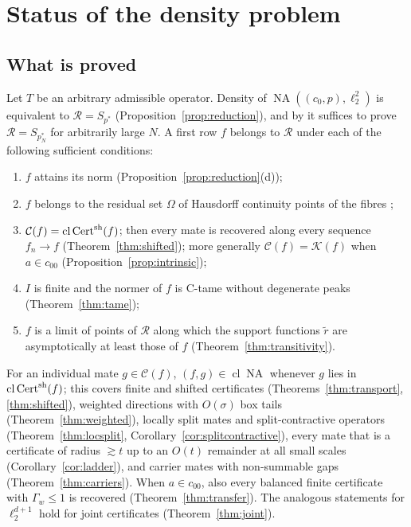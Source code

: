 \documentclass[10pt]{amsart}
\theoremstyle{definition}
\theoremstyle{remark}
\newcommand{\NA}{\operatorname{NA}}
\newcommand{\Cset}{\mathcal C}
\newcommand{\Cert}{\operatorname{Cert}}
\newcommand{\cl}{\operatorname{cl}}
\newcommand{\Rec}{\mathcal R}
\begin{document}
\section{Status of the density problem}\label{sec:status}

\subsection{What is proved}
Let $T$ be an arbitrary admissible operator.  Density of
$\NA((c_0,p),\ell_2^2)$ is equivalent to $\Rec=S_{p^*}$
(Proposition~\ref{prop:reduction}), and by \cite[Remark martin-tail]{PrB} it
suffices to prove $\Rec=S_{p_N^*}$ for arbitrarily large $N$.  A first row
$f$ belongs to $\Rec$ under each of the following sufficient conditions:
\begin{enumerate}
\item[(S1)] $f$ attains its norm (Proposition~\ref{prop:reduction}(d));
\item[(S2)] $f$ belongs to the residual set $\Omega$ of Hausdorff continuity
points of the fibres \cite[Theorem~2.2]{PrA};
\item[(S3)] $\Cset(f)=\cl\Cert^{\rm sh}(f)$; then every mate is recovered
along every sequence $f_n\to f$ (Theorem~\ref{thm:shifted}); more generally
$\Cset(f)=\mathcal K(f)$ when $a\in c_{00}$ (Proposition~\ref{prop:intrinsic});
\item[(S4)] $I$ is finite and the normer of $f$ is C-tame without
degenerate peaks (Theorem~\ref{thm:tame});
\item[(S5)] $f$ is a limit of points of $\Rec$ along which the support
functions $\tilde r$ are asymptotically at least those of $f$
(Theorem~\ref{thm:transitivity}).
\end{enumerate}
For an individual mate $g\in\Cset(f)$, $(f,g)\in\cl\NA$ whenever $g$ lies
in $\cl\Cert^{\rm sh}(f)$; this covers finite and shifted certificates
(Theorems~\ref{thm:transport}, \ref{thm:shifted}), weighted directions with
$O(\sigma)$ box tails (Theorem~\ref{thm:weighted}), locally split mates and
split-contractive operators (Theorem~\ref{thm:locsplit},
Corollary~\ref{cor:splitcontractive}), every mate that is a certificate of
radius $\gtrsim t$ up to an $O(t)$ remainder at all small scales
(Corollary~\ref{cor:ladder}), and carrier mates with non-summable gaps
(Theorem~\ref{thm:carriers}).  When $a\in c_{00}$, also every balanced
finite certificate with $\Gamma_w\le1$ is recovered
(Theorem~\ref{thm:transfer}).  The analogous statements for
$\ell_2^{d+1}$ hold for joint certificates (Theorem~\ref{thm:joint}).
\end{document}

